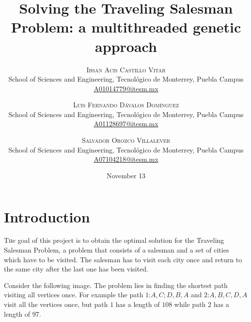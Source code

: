 \documentclass[twoside,twocolumn]{article}
\title{Solving the Traveling Salesman Problem: a multithreaded genetic approach} %
\author{%
  \textsc{Ibsan Acis Castillo Vitar} \\[1ex] %
  \normalsize School of Sciences and Engineering, Tecnológico de Monterrey, Puebla Campus \\ %
  \normalsize \href{mailto:A01014779@itesm.mx}{A01014779@itesm.mx} %
  \and %
  \textsc{Luis Fernando Dávalos Domínguez} \\[1ex] %
  \normalsize School of Sciences and Engineering, Tecnológico de Monterrey, Puebla Campus \\ %
  \normalsize \href{mailto:A01128697@itesm.mx}{A01128697@itesm.mx} %
  \and %
  \textsc{Salvador Orozco Villalever} \\[1ex] %
  \normalsize School of Sciences and Engineering, Tecnológico de Monterrey, Puebla Campus \\ %
  \normalsize \href{mailto:A07104218@itesm.mx}{A07104218@itesm.mx} %
  }
\date{November 13\nth 2017} %
\begin{document}
  
  \maketitle
  
  
  \section{Introduction}
  
  \lettrine[nindent=0em,lines=3]{T}he goal of this project is to obtain the optimal solution for the Traveling Salesman Problem, a problem that consists of a salesman and a set of cities which have to be visited. The salesman has to visit each city once and return to the same city after the last one has been visited.
  
  Consider the following image. The problem lies in finding the shortest path visiting all vertices once. For example the path $1$:${A,C;D,B,A}$ and $2$:${A,B,C,D,A}$ visit all the vertices once, but path $1$ has a length of $108$ while path $2$ has a length of $97$.\linebreak
  
      
\end{document}
